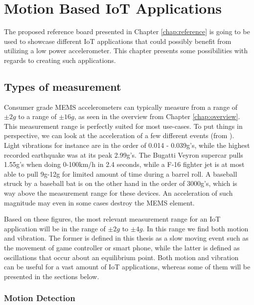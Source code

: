 \chapter{Motion Based IoT Applications}
\label{chap:applications}

The proposed reference board presented in Chapter \ref{chap:reference} is going to be used to showcase different IoT applications that could possibly benefit from utilizing a low power accelerometer. This chapter presents some possibilities with regards to creating such applications. 

\section{Types of measurement}

Consumer grade MEMS accelerometers can typically measure from a range of $\pm2g$ to a range of $\pm16g$, as seen in the overview from Chapter \ref{chap:overview}. This measurement range is perfectly suited for most use-cases. To put things in perspective, we can look at the acceleration of a few different events (from \cite{g-force}). Light vibrations for instance are in the order of 0.014 - 0.039g's, while the highest recorded earthquake was at its peak 2.99g's. The Bugatti Veyron supercar pulls 1.55g's when doing 0-100km/h in 2.4 seconds, while a F-16 fighter jet is at most able to pull 9g-12g for limited amount of time during a barrel roll. A baseball struck by a baseball bat is on the other hand in the order of 3000g's, which is way above the measurement range for these devices. An acceleration of such magnitude may even in some cases destroy the MEMS element. 

Based on these figures, the most relevant measurement range for an IoT application will be in the range of $\pm2g$ to $\pm4g$. In this range we find both motion and vibration. The former is defined in this thesis as a slow moving event such as the movement of game controller or smart phone, while the latter is defined as oscillations that occur about an equilibrium point. Both motion and vibration can be useful for a vast amount of IoT applications, whereas some of them will be presented in the sections below. 

\subsection{Motion Detection}

